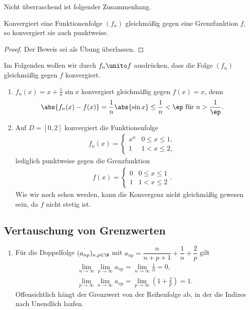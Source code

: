 Nicht überraschend ist folgender Zusammenhang.

\begin{prop}
\label{prop:1.13}
Konvergiert eine Funktionenfolge $(f_n)$ gleichmäßig gegen eine Grenzfunktion
$f$, so konvergiert sie auch punktweise.\fishhere
\end{prop}
\begin{proof}
Der Beweis sei als Übung überlassen.\qedhere
\end{proof}

Im Folgenden wollen wir durch $f_n\unito f$ ausdrücken, dass die Folge $(f_n)$
gleichmäßig gegen $f$ konvergiert.

\begin{bsp}
\label{bsp:1.13}
\begin{enumerate}
\item $f_n(x) = x + \frac{1}{n}\sin x$ konvergiert gleichmäßig gegen
$f(x) = x$, denn
\begin{align*}
\abs{f_n(x)-f(x)} = \frac{1}{n}\abs{\sin x} \le \frac{1}{n} < \ep \text{ für }
n > \frac{1}{\ep}.
\end{align*}
\item Auf $D=[0,2]$ konvergiert die Funktionenfolge
\begin{align*}
f_n(x) = \begin{cases} x^n
& 0\le x\le 1,\\ 1 & 1< x \le 2,\end{cases}
\end{align*}
lediglich punktweise gegen die Grenzfunktion
\begin{align*}
f(x) = \begin{cases} 0 & 0\le x \le 1 \\ 1 & 1 < x \le 2\end{cases}.
\end{align*}
Wie wir noch sehen werden, kann die Konvergenz
nicht gleichmäßig gewesen sein, da $f$ nicht stetig ist.\bsphere
\end{enumerate}
\end{bsp}

\subsection{Vertauschung von Grenzwerten}

\begin{bsp}
\label{bsp:1.15}
\begin{enumerate}
\item Für die Doppelfolge $(a_{np})_{n,p\in \N}$ mit $a_{np} = \dfrac{n}{n+p+1}
+ \dfrac{1}{n} + \dfrac{2}{p}$ gilt
\begin{align*}
&\lim\limits_{n\to\infty}\lim\limits_{p\to\infty} a_{np} =
\lim\limits_{n\to\infty} \frac{1}{n} = 0,\\
&\lim\limits_{p\to\infty}\lim\limits_{n\to\infty} a_{np} =
\lim\limits_{p\to\infty} \left(1+\frac{2}{p}\right) = 1.
\end{align*}
Offensichtlich hängt der Grenzwert von der Reihenfolge ab, in der die Indizes
nach Unendlich laufen.\bsphere
\end{enumerate}
\end{bsp}


